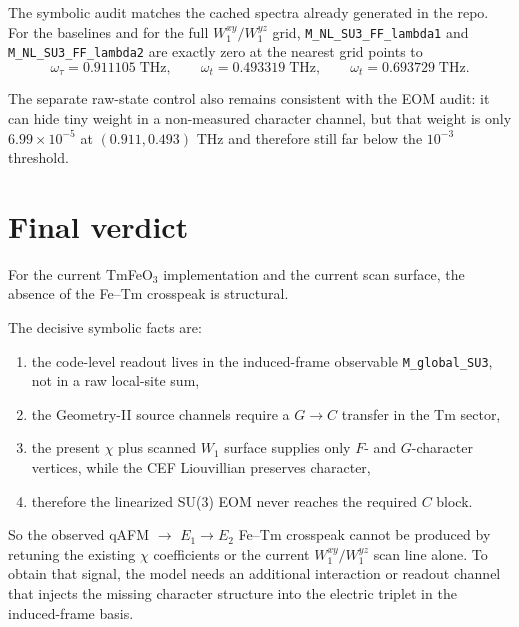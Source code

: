 \documentclass[11pt]{article}
\begin{document}
The symbolic audit matches the cached spectra already generated in the repo.
For the baselines and for the full $W_1^{xy}/W_1^{yz}$ grid,
\texttt{M\_NL\_SU3\_FF\_lambda1} and
\texttt{M\_NL\_SU3\_FF\_lambda2} are exactly zero at the nearest grid points to
\begin{equation}
\omega_\tau = 0.911105\;\mathrm{THz},
\qquad
\omega_t = 0.493319\;\mathrm{THz},
\qquad
\omega_t = 0.693729\;\mathrm{THz}.
\end{equation}

The separate raw-state control also remains consistent with the EOM audit:
it can hide tiny weight in a non-measured character channel, but that weight is
only $6.99\times 10^{-5}$ at $(0.911,0.493)$ THz and therefore still far below
the $10^{-3}$ threshold.

\section{Final verdict}

For the current TmFeO$_3$ implementation and the current scan surface, the
absence of the Fe--Tm crosspeak is structural.

The decisive symbolic facts are:
\begin{enumerate}[leftmargin=*]
\item the code-level readout lives in the induced-frame observable
      \texttt{M\_global\_SU3}, not in a raw local-site sum,
\item the Geometry-II source channels require a $G \rightarrow C$ transfer in
      the Tm sector,
\item the present $\chi$ plus scanned $W_1$ surface supplies only $F$- and
      $G$-character vertices, while the CEF Liouvillian preserves character,
\item therefore the linearized SU(3) EOM never reaches the required $C$ block.
\end{enumerate}

So the observed qAFM $\rightarrow$ $E_1 \rightarrow E_2$ Fe--Tm crosspeak
cannot be produced by retuning the existing $\chi$ coefficients or the current
$W_1^{xy}/W_1^{yz}$ scan line alone. To obtain that signal, the model needs an
additional interaction or readout channel that injects the missing character
structure into the electric triplet in the induced-frame basis.
\end{document}
